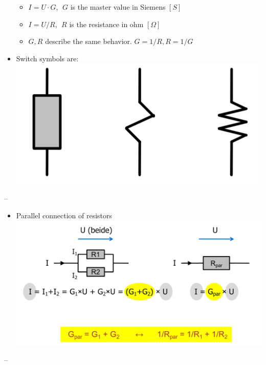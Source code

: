 \documentclass[a4paper]{article}
\providecommand{\tightlist}{%
  \setlength{\itemsep}{0pt}\setlength{\parskip}{0pt}}
\begin{document}
\begin{multicols*}{3}
\begin{itemize}
  \begin{itemize}
  \tightlist
  \item
    \(I=U\cdot G\), \(\;G\) is the master value in Siemens \([S]\)
  \item
    \(I=U/R\), \(\;R\) is the resistance in ohm \([\Omega]\)
  \item
    \(G, R\) describe the same behavior. \(G = 1/R, R = 1/G\)
  \end{itemize}
\item
  Switch symbols are:
  \includegraphics{../assets/images/2022-02-06-21-28-06.png}
\end{itemize}

--

\begin{itemize}
\tightlist
\item
  Parallel connection of resistors
  \includegraphics{../assets/images/2022-02-06-21-31-37.png}
\end{itemize}

--


\end{multicols*}
\end{document}
